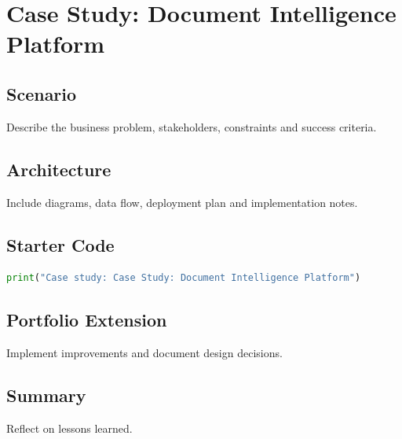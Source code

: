 \chapter{Case Study: Document Intelligence Platform}
\label{chap:vol14-3}



\section{Scenario}
Describe the business problem, stakeholders, constraints and success criteria.

\section{Architecture}
Include diagrams, data flow, deployment plan and implementation notes.

\section{Starter Code}
\begin{lstlisting}[language=Python]
print("Case study: Case Study: Document Intelligence Platform")
\end{lstlisting}

\section{Portfolio Extension}
Implement improvements and document design decisions.

\section{Summary}
Reflect on lessons learned.
